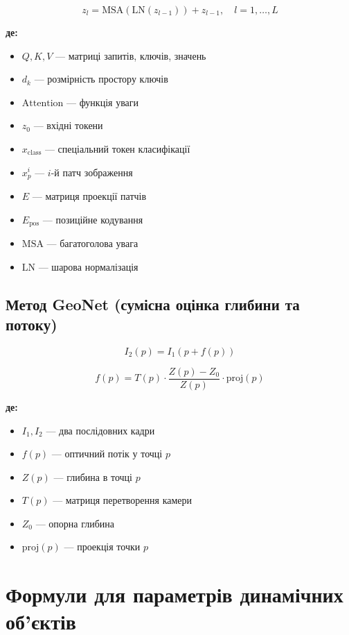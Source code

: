 \documentclass[14pt, a4paper]{extarticle}
\numberwithin{equation}{section}
\begin{document}
\begin{equation}
\boxed{z_l = \text{MSA}(\text{LN}(z_{l-1})) + z_{l-1}, \quad l=1,\ldots,L} \tag{38}
\end{equation}

\textbf{де:}
\begin{itemize}
\item $Q, K, V$ — матриці запитів, ключів, значень
\item $d_k$ — розмірність простору ключів
\item $\text{Attention}$ — функція уваги
\item $z_0$ — вхідні токени
\item $x_{\text{class}}$ — спеціальний токен класифікації
\item $x_p^i$ — $i$-й патч зображення
\item $E$ — матриця проекції патчів
\item $E_{\text{pos}}$ — позиційне кодування
\item $\text{MSA}$ — багатоголова увага
\item $\text{LN}$ — шарова нормалізація
\end{itemize}

\subsection{Метод GeoNet (сумісна оцінка глибини та потоку)}

\begin{equation}
\boxed{I_2(p) = I_1(p + f(p))} \tag{39}
\end{equation}

\begin{equation}
\boxed{f(p) = T(p) \cdot \frac{Z(p) - Z_0}{Z(p)} \cdot \text{proj}(p)} \tag{40}
\end{equation}

\textbf{де:}
\begin{itemize}
\item $I_1, I_2$ — два послідовних кадри
\item $f(p)$ — оптичний потік у точці $p$
\item $Z(p)$ — глибина в точці $p$
\item $T(p)$ — матриця перетворення камери
\item $Z_0$ — опорна глибина
\item $\text{proj}(p)$ — проекція точки $p$
\end{itemize}

\newpage

\section{Формули для параметрів динамічних об'єктів}
\end{document}
